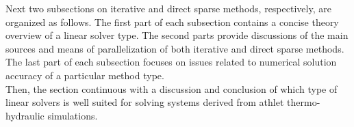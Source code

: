 
Next two subsections on iterative and direct sparse methods, respectively, are organized as follows. The first part of each subsection contains a concise theory overview of a linear solver type. The second parts provide discussions of the main sources and means of parallelization of both iterative and direct sparse methods. The last part of each subsection focuses on issues related to numerical solution accuracy of a particular method type. \\

Then, the section continuous with a discussion and conclusion of which type of linear solvers is well suited for solving  systems derived from \acrshort{athlet} thermo-hydraulic simulations. 

